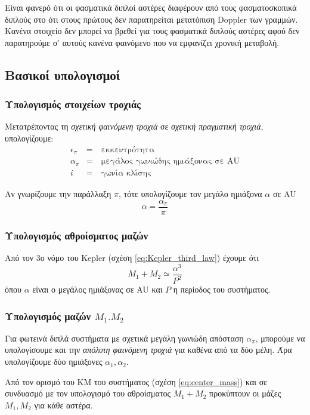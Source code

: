 \begin{enumerate}[label=(\Roman*)]
    Είναι φανερό ότι οι φασματικά διπλοί αστέρες διαφέρουν από τους φασματοσκοπικά διπλούς στο ότι στους πρώτους δεν παρατηρείται μετατόπιση Doppler των γραμμών. Κανένα στοιχείο δεν μπορεί να βρεθεί για τους φασματικά διπλούς αστέρες αφού δεν παρατηρούμε σ' αυτούς κανένα φαινόμενο που να εμφανίζει χρονική μεταβολή.
\end{enumerate}

\subsection{Βασικοί υπολογισμοί}

\subsubsection{Υπολογισμός στοιχείων τροχιάς}
Μετατρέποντας τη \textit{σχετική φαινόμενη τροχιά} σε \textit{σχετική πραγματική τροχιά}, υπολογίζουμε:
\begin{eqnarray*}
    \epsilon_{\pi} &=& \ \text{εκκεντρότητα} \\
    \alpha_{\pi} &=& \ \text{μεγάλος γωνιώδης ημιάξονας σε AU} \\
    i &=& \ \text{γωνία κλίσης}
\end{eqnarray*}

Αν γνωρίζουμε την παράλλαξη $\pi$, τότε υπολογίζουμε τον μεγάλο ημιάξονα $\alpha$ σε AU
\begin{equation}
    \alpha = \frac{\alpha_{\pi}}{\pi}
\end{equation}

\subsubsection{Υπολογισμός αθροίσματος μαζών}
Από τον 3ο νόμο του Kepler (σχέση \eqref{eq:Kepler_third_law}) έχουμε ότι 
$$M_1 + M_2 \simeq \frac{\alpha ^3}{P^2}$$ όπου $\alpha$ είναι ο μεγάλος ημιάξονας σε AU και $P$ η περίοδος του συστήματος.


\subsubsection{Υπολογισμός μαζών $M_1. M_2$}
Για φωτεινά διπλά συστήματα με σχετικά μεγάλη γωνιώδη απόσταση $\alpha_{\pi}$, μπορούμε να υπολογίσουμε και την \textit{απόλυτη φαινόμενη τροχιά} για καθένα από τα δύο μέλη. Άρα υπολογίζουμε δύο ημιάξονες $\alpha_1, \alpha_2$.

Από τον ορισμό του ΚΜ του συστήματος (σχέση \eqref{eq:center_mass}) και σε συνδυασμό με τον υπολογισμό του αθροίσματος $M_1 + M_2$ προκύπτουν οι μάζες $M_1, M_2$ για κάθε αστέρα.

